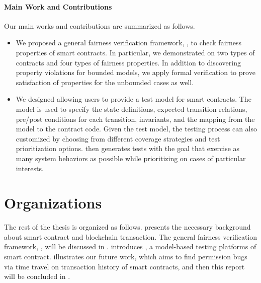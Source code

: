 \paragraph{Main Work and Contributions}
Our main works and contributions are summarized as follows.
\begin{itemize}[leftmargin=*,topsep=4pt]
\item We proposed a general fairness verification framework, \faircon, to check fairness properties of smart contracts.
In particular, we demonstrated \faircon on two types of contracts and four types of fairness properties.
In addition to discovering property violations for bounded models, we apply formal
verification to prove satisfaction of properties for the unbounded cases as well.

\item We designed \modcon allowing users to provide a test model for smart contracts. 
The model is used to specify the state definitions, expected transition relations, pre/post conditions for each transition, invariants, and the mapping from the model to the contract code.
Given the test model, the testing process can also customized by choosing from different coverage strategies and test prioritization options.
\modcon then generates tests with the goal that exercise as many system behaviors as possible while prioritizing on cases of particular interests.

\end{itemize}



\section{Organizations}
The rest of the thesis is organized as follows.
 presents the necessary background about smart contract and blockchain transaction.
The general fairness verification framework, \faircon, will be discussed in .
 introduces \modcon, a model-based testing platforms of smart contract.
 illustrates our future work, which aims to find permission bugs via time travel on transaction history of smart contracts,
and then this report will be concluded in .


